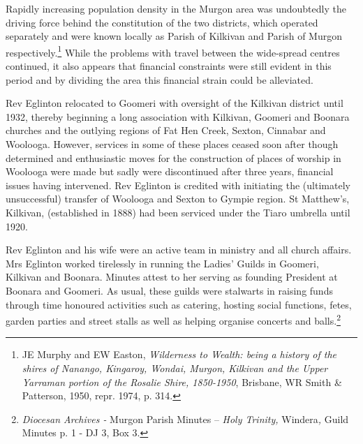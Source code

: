 Rapidly increasing population density in the Murgon area was undoubtedly the driving force behind the constitution of the two districts, which operated separately and were known locally as Parish of Kilkivan and Parish of Murgon respectively.\footnote{JE Murphy and EW Easton, \emph{Wilderness to Wealth: being a history of the shires of Nanango, Kingaroy, Wondai, Murgon, Kilkivan and the Upper Yarraman portion of the Rosalie Shire, 1850-1950}, Brisbane, WR Smith \& Patterson, 1950, repr. 1974, p. 314.} While the problems with travel between the wide-spread centres continued, it also appears that financial constraints were still evident in this period and by dividing the area this financial strain could be alleviated.


Rev Eglinton relocated to Goomeri with oversight of the Kilkivan district until 1932, thereby beginning a long association with Kilkivan, Goomeri and Boonara churches and the outlying regions of Fat Hen Creek, Sexton, Cinnabar and Woolooga. However, services in some of these places ceased soon after though determined and enthusiastic moves for the construction of places of worship in Woolooga were made but sadly were discontinued after three years, financial issues having intervened. Rev Eglinton is credited with initiating the (ultimately unsuccessful) transfer of Woolooga and Sexton to Gympie region. St Matthew's, Kilkivan, (established in 1888) had been serviced under the Tiaro umbrella until 1920.



Rev Eglinton and his wife were an active team in ministry and all church affairs. Mrs Eglinton worked tirelessly in running the Ladies' Guilds in Goomeri, Kilkivan and Boonara. Minutes attest to her serving as founding President at Boonara and Goomeri. As usual, these guilds were stalwarts in raising funds through time honoured activities such as catering, hosting social functions, fetes, garden parties and street stalls as well as helping organise concerts and balls.\footnote{\emph{Diocesan Archives -} Murgon Parish Minutes -- \emph{Holy Trinity,} Windera\emph{,} Guild Minutes p. 1 - DJ 3, Box 3.}


\balance


